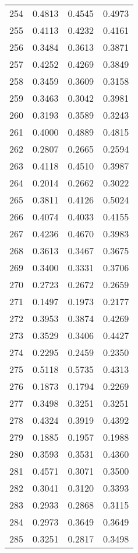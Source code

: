 \begin{table}[ht]
\begin{tabular}{|c|c|c|c|}
254  &  0.4813   &  0.4545   &  0.4973 \\ 
255  &  0.4113   &  0.4232   &  0.4161 \\ 
256  &  0.3484   &  0.3613   &  0.3871 \\ 
257  &  0.4252   &  0.4269   &  0.3849 \\ 
258  &  0.3459   &  0.3609   &  0.3158 \\ 
259  &  0.3463   &  0.3042   &  0.3981 \\ 
260  &  0.3193   &  0.3589   &  0.3243 \\ 
261  &  0.4000   &  0.4889   &  0.4815 \\ 
262  &  0.2807   &  0.2665   &  0.2594 \\ 
263  &  0.4118   &  0.4510   &  0.3987 \\ 
264  &  0.2014   &  0.2662   &  0.3022 \\ 
265  &  0.3811   &  0.4126   &  0.5024 \\ 
266  &  0.4074   &  0.4033   &  0.4155 \\ 
267  &  0.4236   &  0.4670   &  0.3983 \\ 
268  &  0.3613   &  0.3467   &  0.3675 \\ 
269  &  0.3400   &  0.3331   &  0.3706 \\ 
270  &  0.2723   &  0.2672   &  0.2659 \\ 
271  &  0.1497   &  0.1973   &  0.2177 \\ 
272  &  0.3953   &  0.3874   &  0.4269 \\ 
273  &  0.3529   &  0.3406   &  0.4427 \\ 
274  &  0.2295   &  0.2459   &  0.2350 \\ 
275  &  0.5118   &  0.5735   &  0.4313 \\ 
276  &  0.1873   &  0.1794   &  0.2269 \\ 
277  &  0.3498   &  0.3251   &  0.3251 \\ 
278  &  0.4324   &  0.3919   &  0.4392 \\ 
279  &  0.1885   &  0.1957   &  0.1988 \\ 
280  &  0.3593   &  0.3531   &  0.4360 \\ 
281  &  0.4571   &  0.3071   &  0.3500 \\ 
282  &  0.3041   &  0.3120   &  0.3393 \\ 
283  &  0.2933   &  0.2868   &  0.3115 \\ 
284  &  0.2973   &  0.3649   &  0.3649 \\ 
285  &  0.3251   &  0.2817   &  0.3498 \\ 

\end{tabular}
\end{table}
